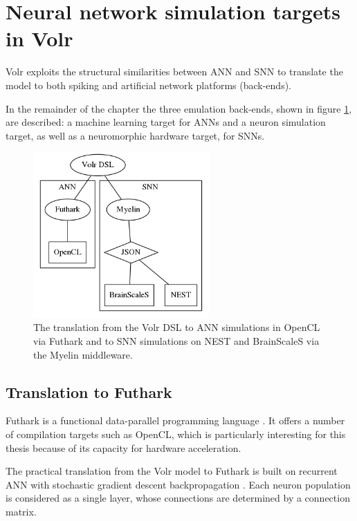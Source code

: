 \section{Neural network simulation targets in Volr} \label{sec:volr-targets}

Volr exploits the structural similarities between \gls{ANN} and \gls{SNN} to
translate the model to both spiking and artificial network platforms (back-ends).

In the remainder of the chapter the three emulation back-ends, shown in figure
\ref{fig:volr}, are described:
a machine learning target for \gls{ANN}s and a neuron simulation target, as well
as a neuromorphic hardware target, for \gls{SNN}s.

\begin{figure}
  \centering
  \includegraphics[width=0.6\textwidth]{images/volr-architecture.png}
  \caption{The translation from the Volr DSL to \gls{ANN} simulations in OpenCL via
    \gls{Futhark} and to \gls{SNN} simulations on \gls{NEST} and \gls{BrainScaleS}
    via the \gls{Myelin} middleware.
  }
  \label{fig:volr}
\end{figure}

\subsection{Translation to Futhark} \label{sec:volr-futhark}
Futhark is a functional data-parallel programming language \autocite{Henriksen2017}.
It offers a number of compilation targets such as \gls{OpenCL}, which is
particularly interesting for this thesis because of its capacity for hardware
acceleration.

The practical translation from the Volr model to Futhark is built on recurrent
\gls{ANN} with stochastic gradient descent backpropagation
\autocite{russel2007, schmidhuber2014}.
Each neuron population is considered as a single layer, whose connections are
determined by a connection matrix.


